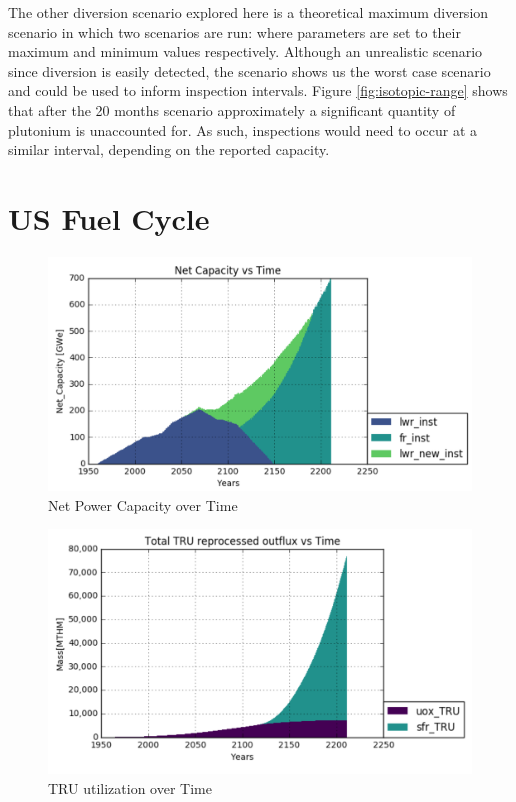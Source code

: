 The other diversion scenario explored here is a theoretical maximum diversion scenario in which two scenarios are run: where parameters are set to their maximum and minimum values
respectively. Although an unrealistic scenario since diversion is easily detected, the scenario shows us the worst case scenario and could be used to inform inspection intervals.
Figure \ref{fig:isotopic-range} shows that after the 20 months scenario approximately a significant quantity of plutonium is unaccounted for. As such, inspections would need to occur
at a similar interval, depending on the reported capacity.

\section{US Fuel Cycle}

\begin{figure} [h]
	\centering
	\includegraphics[width=\linewidth]{images/transition-netcap}
	\caption{Net Power Capacity over Time}
	\label{fig:net-cap}
\end{figure}

\begin{figure} [h]
	\centering
	\includegraphics[width=\linewidth]{images/transition-TRUutil}
	\caption{TRU utilization over Time}
	\label{fig:TRU-util}
\end{figure}

